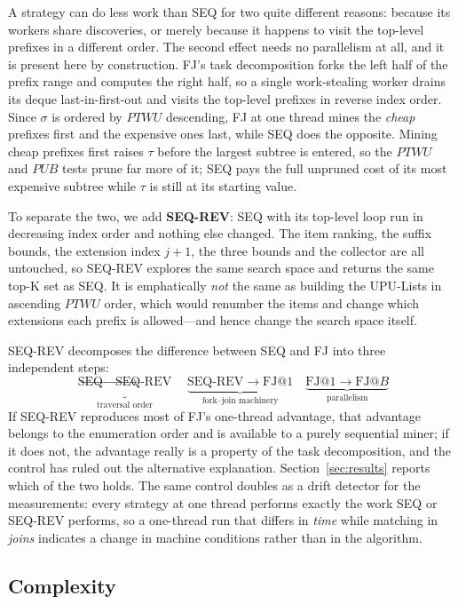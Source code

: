 \documentclass[pdflatex,sn-vancouver-num]{sn-jnl}
\theoremstyle{thmstyleone}%
\theoremstyle{thmstyletwo}%
\theoremstyle{thmstylethree}%
\newcommand{\PTWU}{\mathit{PTWU}}
\newcommand{\PUB}{\mathit{PUB}}
\newcommand{\Kk}{\mathrm{K}}
\begin{document}
A strategy can do less work than SEQ for two quite different reasons:
because its workers share discoveries, or merely because it happens to
visit the top-level prefixes in a different order. The second effect
needs no parallelism at all, and it is present here by construction.
FJ's task decomposition forks the left half of the prefix range and
computes the right half, so a single work-stealing worker drains its
deque last-in-first-out and visits the top-level prefixes in reverse
index order. Since $\sigma$ is ordered by $\PTWU$ descending, FJ at one
thread mines the \emph{cheap} prefixes first and the expensive ones
last, while SEQ does the opposite. Mining cheap prefixes first raises
$\tau$ before the largest subtree is entered, so the $\PTWU$ and $\PUB$
tests prune far more of it; SEQ pays the full unpruned cost of its most
expensive subtree while $\tau$ is still at its starting value.
 
To separate the two, we add \textbf{SEQ-REV}: SEQ with its top-level
loop run in decreasing index order and nothing else changed. The item
ranking, the suffix bounds, the extension index $j+1$, the three bounds
and the collector are all untouched, so SEQ-REV explores the same search
space and returns the same top-$\Kk$ set as SEQ. It is emphatically
\emph{not} the same as building the UPU-Lists in ascending $\PTWU$
order, which would renumber the items and change which extensions each
prefix is allowed---and hence change the search space itself.
 
SEQ-REV decomposes the difference between SEQ and FJ into three
independent steps:
\[
\underbrace{\text{SEQ}\to\text{SEQ-REV}}_{\text{traversal order}}\quad
\underbrace{\text{SEQ-REV}\to\text{FJ}@1}_{\text{fork--join machinery}}\quad
\underbrace{\text{FJ}@1\to\text{FJ}@B}_{\text{parallelism}}
\]
If SEQ-REV reproduces most of FJ's one-thread advantage, that advantage
belongs to the enumeration order and is available to a purely sequential
miner; if it does not, the advantage really is a property of the task
decomposition, and the control has ruled out the alternative
explanation. Section~\ref{sec:results} reports which of the two holds.
The same control doubles as a drift detector for the measurements: every
strategy at one thread performs exactly the work SEQ or SEQ-REV
performs, so a one-thread run that differs in \emph{time} while matching
in \emph{joins} indicates a change in machine conditions rather than in
the algorithm.


\subsection{Complexity}\label{subsec:complexity}
 
\end{document}
